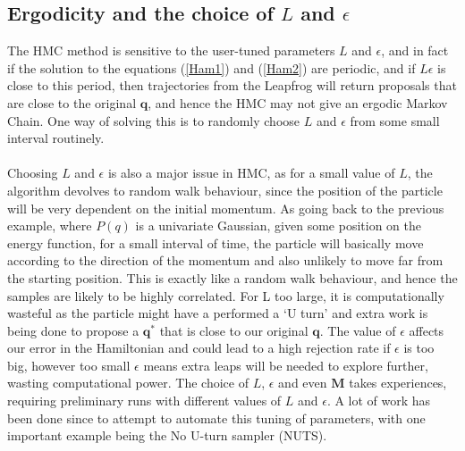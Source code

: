 \documentclass[11pt]{article}
\begin{document}
\subsection{Ergodicity and the choice of $L$ and $\epsilon$}
The HMC method is sensitive to the user-tuned parameters $L$ and $\epsilon$, and in fact if the solution to the equations (\ref{Ham1}) and (\ref{Ham2}) are periodic, and if $L\epsilon$ is close to this period, then trajectories from the Leapfrog will return proposals that are close to the original $\mathbf{q}$, and hence the HMC may not give an ergodic Markov Chain. One way of solving this is to randomly choose $L$ and $\epsilon$ from some small interval routinely. 
\\
\\
Choosing $L$ and $\epsilon$ is also a major issue in HMC, as for a small value of $L$, the algorithm devolves to random walk behaviour, since the position of the particle will be very dependent on the initial momentum. As going back to the previous example, where $P(q)$ is a univariate Gaussian, given some position on the energy function, for a small interval of time, the particle will basically move according to the direction of the momentum and also unlikely to move far from the starting position. This is exactly like  a random walk behaviour, and hence the samples are likely to be highly correlated. For L too large, it is computationally wasteful as the particle might have a performed a `U turn' and extra work is being done to propose a $\mathbf{q^{*}}$ that is close to our original $\mathbf{q}$. The value of $\epsilon$ affects our error in the Hamiltonian and could lead to a high rejection rate if $\epsilon$ is too big, however too small $\epsilon$ means extra leaps will be needed to explore further, wasting computational power. The choice of $L$, $\epsilon$ and even $\mathbf{M}$ takes experiences, requiring preliminary runs with different values of $L$ and $\epsilon$. A lot of work has been done since to attempt to automate this tuning of parameters, with one important example being the No U-turn sampler (NUTS).
\end{document}
